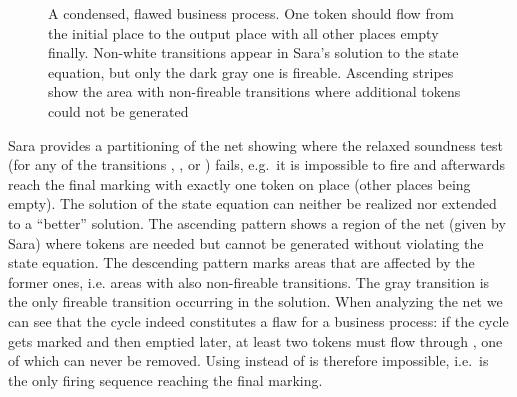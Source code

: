 \documentclass{LMCS}
\begin{document}
\begin{figure}[tb]
\centering
{}
\caption{\label{f.counternet}A condensed, flawed business process. One token should flow
	from the initial place  to the output place  with all other places empty finally.
	Non-white transitions
	appear in Sara's solution to the state equation, but only the dark gray one is fireable.
	Ascending stripes show the area with non-fireable transitions where additional tokens could not be generated}
\end{figure}

Sara provides a partitioning of the net showing where the relaxed soundness test (for any of the
transitions , , or ) fails, e.g.\ it is impossible to fire  and afterwards reach the
final marking with exactly one token on place  (other places being empty). The solution 
 of the state equation
can neither be realized nor extended to a ``better'' solution.
The ascending pattern shows a region of the net (given by Sara)
where tokens are needed but cannot be generated without violating the state equation.
The descending pattern marks areas that are affected by the former ones, i.e. areas with
also non-fireable transitions. The gray transition  is the only fireable transition occurring
in the solution. When analyzing the net we can see that the cycle  indeed
constitutes a flaw for a business process: if the cycle gets marked and then emptied later,
at least two tokens must flow through , one of which can never be removed.
Using  instead of  is therefore impossible, i.e.\  is the only
firing sequence reaching the final marking.
\end{document}
